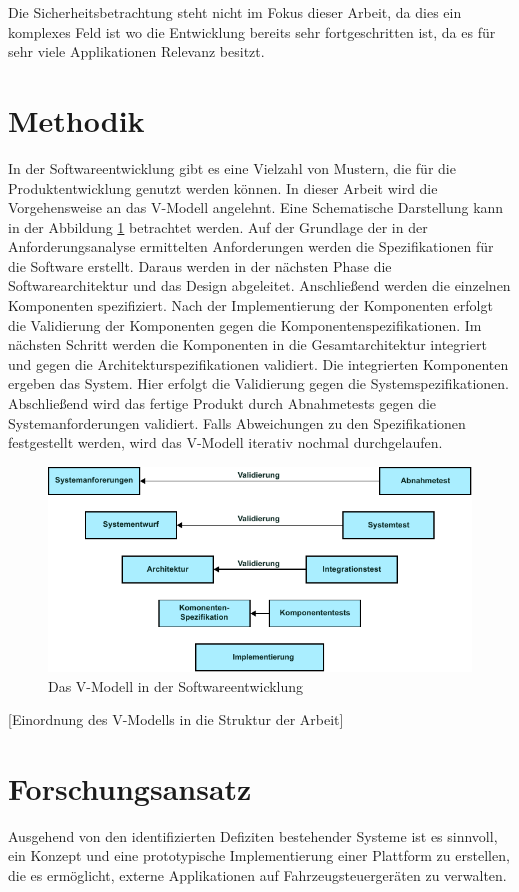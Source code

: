 Die Sicherheitsbetrachtung steht nicht im Fokus dieser Arbeit, da dies ein komplexes Feld ist wo die Entwicklung bereits sehr fortgeschritten ist, da es für sehr viele Applikationen Relevanz besitzt. 

\section{Methodik}

In der Softwareentwicklung gibt es eine Vielzahl von Mustern, die für die Produktentwicklung genutzt werden können. \cite{Bass2012} In dieser Arbeit wird die Vorgehensweise an das V-Modell angelehnt. Eine Schematische Darstellung kann in der Abbildung \ref{v-model} betrachtet werden. Auf der Grundlage der in der Anforderungsanalyse ermittelten Anforderungen werden die Spezifikationen für die Software erstellt. Daraus werden in der nächsten Phase die Softwarearchitektur und das Design abgeleitet. Anschließend werden die einzelnen Komponenten spezifiziert. Nach der Implementierung der Komponenten erfolgt die Validierung der Komponenten gegen die Komponentenspezifikationen. Im nächsten Schritt werden die Komponenten in die Gesamtarchitektur integriert und gegen die Architekturspezifikationen validiert. Die integrierten Komponenten ergeben das System. Hier erfolgt die Validierung gegen die Systemspezifikationen. Abschließend wird das fertige Produkt durch Abnahmetests gegen die Systemanforderungen validiert. Falls Abweichungen zu den Spezifikationen festgestellt werden, wird das V-Modell iterativ nochmal durchgelaufen. 

\begin{figure}[htbp]
	\centering
	\includegraphics[width=\textwidth]{./content/graphics/V-model.pdf}
	\caption{Das V-Modell in der Softwareentwicklung}
	\label{v-model}
\end{figure}

[Einordnung des V-Modells in die Struktur der Arbeit]

\section{Forschungsansatz}

Ausgehend von den identifizierten Defiziten bestehender Systeme ist es sinnvoll, ein Konzept und eine prototypische Implementierung einer Plattform zu erstellen, die es ermöglicht, externe Applikationen auf Fahrzeugsteuergeräten zu verwalten.